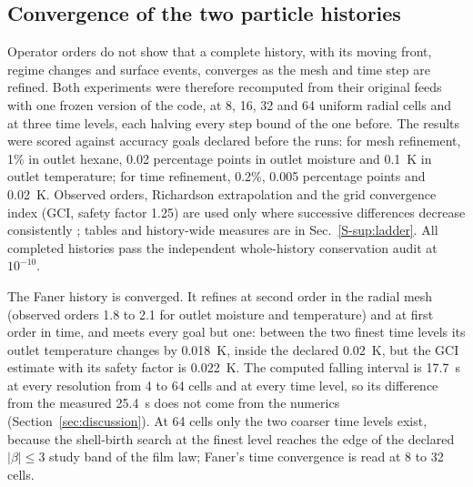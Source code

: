 \subsection{Convergence of the two particle histories}
\label{sec:verification:convergence}
Operator orders do not show that a complete history, with its moving
front, regime changes and surface events, converges as the mesh and time
step are refined. Both experiments were therefore recomputed from their
original feeds with one frozen version of the code, at 8, 16, 32 and
64 uniform radial cells and at three time levels, each halving every
step bound of the one before. The results were scored against accuracy
goals declared before the runs: for mesh refinement, 1\% in outlet hexane,
0.02 percentage points in outlet moisture and 0.1~K in outlet temperature;
for time refinement, 0.2\%, 0.005 percentage points and 0.02~K. Observed
orders, Richardson extrapolation and the grid convergence index (GCI,
safety factor 1.25) are used only where successive differences decrease
consistently \citep{roache1998verification}; tables and history-wide
measures are in Sec.~\ref*{S-sup:ladder}. All completed histories pass the
independent whole-history conservation audit at $10^{-10}$.

The Faner history is converged. It refines at second order in the radial
mesh (observed orders 1.8 to 2.1 for outlet moisture and temperature) and
at first order in time, and meets every goal but one: between the two
finest time levels its outlet temperature changes by 0.018~K, inside the
declared 0.02~K, but the GCI estimate with its safety factor is 0.022~K.
The computed falling interval is 17.7~s at every resolution from 4 to
64 cells and at every time level, so its difference from the measured
25.4~s does not come from the numerics (Section~\ref{sec:discussion}).
At 64 cells only the two coarser time levels exist, because the
shell-birth search at the finest level reaches the edge of the declared
$|\beta|\le3$ study band of the film law; Faner's time convergence is read
at 8 to 32 cells.

